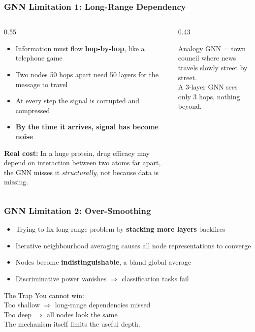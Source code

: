 \begin{frame}[fragile]\frametitle{GNN Limitation 1: Long-Range Dependency}

\begin{columns}
  \begin{column}[T]{0.55\linewidth}
    \begin{itemize}
      \item Information must flow \textbf{hop-by-hop}, like a telephone game
      \item Two nodes 50 hops apart need 50 layers for the message to travel
      \item At every step the signal is corrupted and compressed
      \item \textbf{By the time it arrives, signal has become noise}
    \end{itemize}
    \vspace{0.5em}
    \textbf{Real cost:} In a huge protein, drug efficacy may depend on interaction between two atoms far apart, the GNN misses it \emph{structurally}, not because data is missing.
  \end{column}
  \begin{column}[T]{0.43\linewidth}
    \begin{block}{Analogy}
      GNN = town council where news travels slowly street by street.\\[0.5em]
      A 3-layer GNN sees only 3 hops, nothing beyond.
    \end{block}
  \end{column}
\end{columns}

\end{frame}


\begin{frame}[fragile]\frametitle{GNN Limitation 2: Over-Smoothing}

\begin{itemize}
  \item Trying to fix long-range problem by \textbf{stacking more layers} backfires
  \item Iterative neighbourhood averaging causes all node representations to converge
  \item Nodes become \textbf{indistinguishable}, a bland global average
  \item Discriminative power vanishes $\Rightarrow$ classification tasks fail
\end{itemize}

\vspace{0.5em}
\begin{block}{The Trap}
  You cannot win:\\
  \quad Too shallow $\Rightarrow$ long-range dependencies missed\\
  \quad Too deep $\Rightarrow$ all nodes look the same\\
  The mechanism itself limits the useful depth.
\end{block}

\end{frame}


